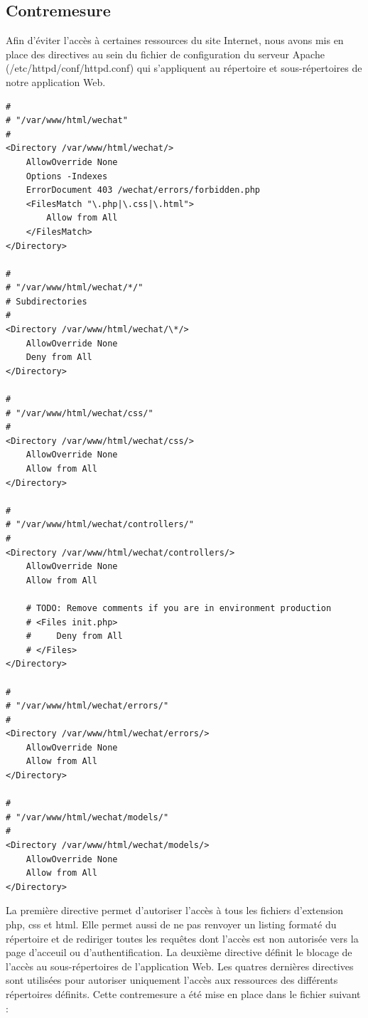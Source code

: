 \documentclass[12pt]{article}
\begin{document}
\newpage
\subsection{Contremesure}\label{c5}

Afin d'éviter l'accès à certaines ressources du site Internet, nous avons mis en place des directives au sein du fichier de configuration du serveur Apache (/etc/httpd/conf/httpd.conf) qui s'appliquent au répertoire et sous-répertoires de notre application Web.

\begin{lstlisting}[style=JAVA]
#
# "/var/www/html/wechat"
#
<Directory /var/www/html/wechat/>
    AllowOverride None
    Options -Indexes
    ErrorDocument 403 /wechat/errors/forbidden.php
    <FilesMatch "\.php|\.css|\.html">
        Allow from All
    </FilesMatch>
</Directory>

#
# "/var/www/html/wechat/*/"
# Subdirectories
#
<Directory /var/www/html/wechat/\*/>
    AllowOverride None
    Deny from All
</Directory>

#
# "/var/www/html/wechat/css/"
#
<Directory /var/www/html/wechat/css/>
    AllowOverride None
    Allow from All
</Directory>

#
# "/var/www/html/wechat/controllers/"
#
<Directory /var/www/html/wechat/controllers/>
    AllowOverride None
    Allow from All

    # TODO: Remove comments if you are in environment production
    # <Files init.php>
    #     Deny from All   
    # </Files>
</Directory>

#
# "/var/www/html/wechat/errors/"
#
<Directory /var/www/html/wechat/errors/>
    AllowOverride None
    Allow from All
</Directory>

#
# "/var/www/html/wechat/models/"
#
<Directory /var/www/html/wechat/models/>
    AllowOverride None
    Allow from All
</Directory>
\end{lstlisting}

La première directive permet d'autoriser l'accès à tous les fichiers d'extension php, css et html. Elle permet aussi de ne pas renvoyer un listing formaté du répertoire et de rediriger toutes les requêtes dont l'accès est non autorisée vers la page d'acceuil ou d'authentification. 
La deuxième directive définit le blocage de l'accès au sous-répertoires de l'application Web.
Les quatres dernières directives sont utilisées pour autoriser uniquement l'accès aux ressources des différents répertoires définits.
Cette contremesure a été mise en place dans le fichier suivant :
\end{document}
